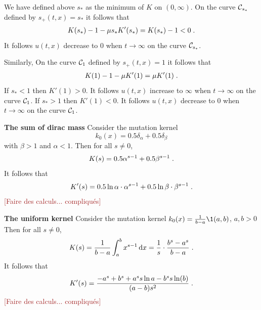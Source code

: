 \documentclass[11pt]{amsart}
\newcommand{\diff}{\,\mathrm{d}}
\newcommand{\ndr}[1]{\textcolor{brown}{[#1]}}
\begin{document}
    \begin{remark}
    We have defined above $s_*$ as the minimum of $K$ on $(0, \infty)$. On the curve $\mathcal{C}_{s_*}$ defined by $s_+(t, x) = s_*$ it follows that 
    \begin{align*}
        K(s_*)-1 -  \mu s_* K'(s_*) = K(s_*)-1 < 0
        \; .
    \end{align*}
    It follows $u(t, x)$ decrease to $0$ when $t \to \infty$ on the curve $\mathcal{C}_{s_*}$. 

    Similarly, On the curve $\mathcal{C}_{1}$ defined by $s_+(t, x) = 1$ it follows that 
    \begin{align*}
        K(1)-1 -  \mu K'(1) = \mu K'(1)
        \; .
    \end{align*}
    If $s_* < 1$ then $K'(1) > 0$. 
    It follows $u(t, x)$ increase to $\infty$ when $t \to \infty$ on the curve $\mathcal{C}_{1}$.  If $s_* > 1$ then $K'(1) < 0$. 
    It follows $u(t, x)$ decrease to $0$ when $t \to \infty$ on the curve $\mathcal{C}_{1}$. 
    \end{remark}

\textbf{The sum of dirac mass} Consider the mutation kernel $$k_0(x) = 0.5\delta_\alpha + 0.5\delta_\beta$$ with $\beta > 1$ and $\alpha < 1.$
Then for all $s \neq 0$, 
\begin{align*}
    K(s) = 0.5\alpha^{s-1}+ 0.5\beta^{s-1}
    \; .
\end{align*}
It follows that 
\begin{align*}
    K'(s) = 0.5\ln{\alpha} \cdot \alpha^{s-1} + 0.5\ln{\beta} \cdot \beta^{s-1}
    \; .
\end{align*}
\ndr{Faire des calculs... compliqués}

\textbf{The uniform kernel} Consider the mutation kernel $k_0(x) = \frac{1}{b-a}\1{(a,b)}$, $a,b > 0$ \\
Then for all $s \neq 0$, 
    \begin{align*}
        K(s) = \frac{1}{b-a}\int_a^b x^{s-1}\diff x = \frac1s \cdot\frac{b^s - a^s}{b-a}
        \eqfinp
    \end{align*}
It follows that 
\begin{align*}
    K'(s) =  \frac{-a^s + b^s + a^s s \ln a - b^s s \ln(b)}{(a - b) s^2}
    \; .
\end{align*}
\ndr{Faire des calculs... compliqués}




\end{document}
